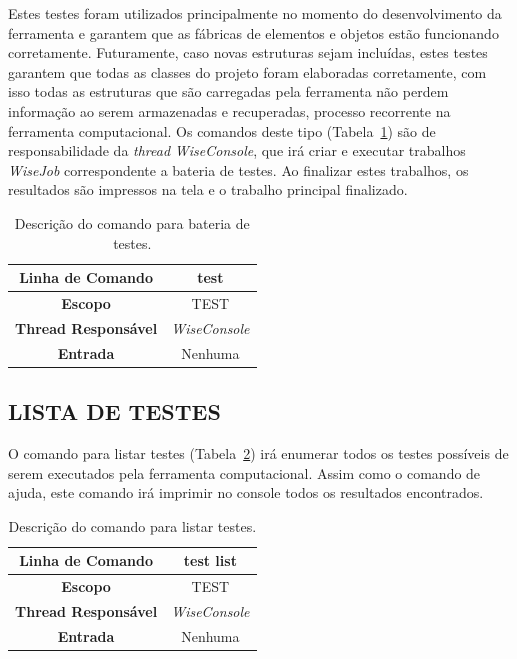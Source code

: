 Estes testes foram utilizados principalmente no momento do desenvolvimento da ferramenta e garantem que as fábricas de elementos e objetos estão funcionando corretamente. Futuramente, caso novas estruturas sejam incluídas, estes testes garantem que todas as classes do projeto foram elaboradas corretamente, com isso todas as estruturas que são carregadas pela ferramenta não perdem informação ao serem armazenadas e recuperadas, processo recorrente na ferramenta computacional. Os comandos deste tipo (Tabela~\ref{tab:test}) são de responsabilidade da \textit{thread} \textit{WiseConsole}, que irá criar e executar trabalhos \textit{WiseJob} correspondente a bateria de testes. Ao finalizar estes trabalhos, os resultados são impressos na tela e o trabalho principal finalizado.

\begin{center}
	\begin{table}[!htbp]
		\begin{tabularx}{\textwidth}{c|X}
			\toprule
			\textbf{Linha de Comando} & \multicolumn{1}{c}{test} \\
			\midrule
			\textbf{Escopo} & \multicolumn{1}{c}{TEST} \\
			\hline
			\textbf{Thread Responsável} & \multicolumn{1}{c}{\textit{WiseConsole}} \\
			\hline
			\textbf{Entrada} & \multicolumn{1}{c}{Nenhuma} \\
			\bottomrule
		\end{tabularx}
		\caption{Descrição do comando para bateria de testes.}
		\label{tab:test}
	\end{table}
\end{center}

\subsection{LISTA DE TESTES}\label{sec:test list}

O comando para listar testes (Tabela~\ref{tab:list_test}) irá enumerar todos os testes possíveis de serem executados pela ferramenta computacional. Assim como o comando de ajuda, este comando irá imprimir no console todos os resultados encontrados.

\begin{center}
	\begin{table}[!htbp]
		\begin{tabularx}{\textwidth}{c|X}
			\toprule
			\textbf{Linha de Comando} & \multicolumn{1}{c}{test list} \\
			\midrule
			\textbf{Escopo} & \multicolumn{1}{c}{TEST} \\
			\hline
			\textbf{Thread Responsável} & \multicolumn{1}{c}{\textit{WiseConsole}} \\
			\hline
			\textbf{Entrada} & \multicolumn{1}{c}{Nenhuma} \\
			\bottomrule
		\end{tabularx}
		\caption{Descrição do comando para listar testes.}
		\label{tab:list_test}
	\end{table}
\end{center}

